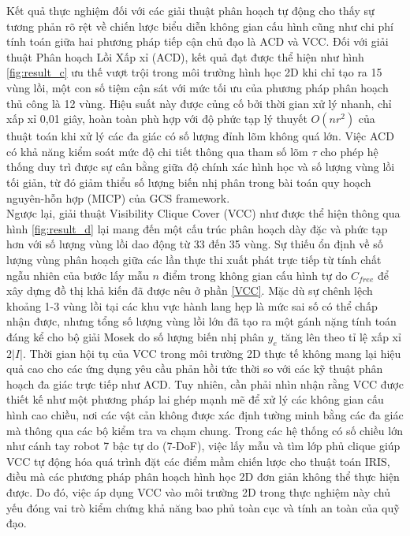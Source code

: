 Kết quả thực nghiệm đối với các giải thuật phân hoạch tự động cho thấy sự tương phản rõ rệt về chiến lược biểu diễn không gian cấu hình cũng như chi phí tính toán
giữa hai phương pháp tiếp cận chủ đạo là ACD và VCC. Đối với giải thuật Phân hoạch Lồi Xấp xỉ (ACD), 
kết quả đạt được thể hiện như hình \ref{fig:result_c} ưu thế vượt trội trong môi trường hình học 2D khi chỉ tạo ra 15 vùng lồi, một con số tiệm cận sát với mức tối ưu của phương pháp phân hoạch thủ công là 12 vùng. 
Hiệu suất này được củng cố bởi thời gian xử lý nhanh, chỉ xấp xỉ 0,01 giây, hoàn toàn phù hợp với độ phức tạp lý thuyết $O(nr^2)$ \cite{LienAmato2006} của thuật toán khi xử lý các đa giác có số lượng đỉnh lõm không quá lớn. 
Việc ACD có khả năng kiểm soát mức độ chi tiết thông qua tham số lõm $\tau$ cho phép hệ thống duy trì được sự cân bằng giữa độ chính xác hình học và số lượng vùng lồi tối giản, từ đó giảm thiểu số lượng biến nhị phân trong bài toán quy hoạch nguyên-hỗn hợp (MICP) 
của GCS framework. \\
Ngược lại, giải thuật Visibility Clique Cover (VCC) như được thể hiện thông qua hình \ref{fig:result_d} lại mang đến một cấu trúc phân hoạch dày đặc và phức tạp hơn với số lượng vùng lồi dao động từ 33 đến 35 vùng. Sự thiếu ổn định về số lượng vùng phân hoạch giữa các lần thực thi xuất phát trực tiếp 
từ tính chất ngẫu nhiên của bước lấy mẫu $n$ điểm trong không gian cấu hình tự do $C_{free}$ để xây dựng đồ thị khả kiến đã được nêu ở phần \ref{VCC}. Mặc dù sự chênh lệch khoảng 1-3 vùng lồi tại các khu vực hành lang hẹp là mức sai số có thể chấp nhận được, nhưng tổng số lượng vùng lồi lớn đã tạo 
ra một gánh nặng tính toán đáng kể cho bộ giải Mosek do số lượng biến nhị phân $y_e$ tăng lên theo tỉ lệ xấp xỉ $2|I|$. Thời gian hội tụ của VCC trong môi trường 2D thực tế không mang lại hiệu quả cao cho các ứng dụng yêu cầu phản hồi tức thời so với các kỹ thuật phân hoạch 
đa giác trực tiếp như ACD. Tuy nhiên, cần phải nhìn nhận rằng VCC được thiết kế như một phương pháp lai ghép mạnh mẽ để xử lý các không gian cấu hình cao chiều, nơi các vật cản không được xác định tường minh bằng các đa giác mà thông qua các bộ kiểm tra va chạm chung. 
Trong các hệ thống có số chiều lớn như cánh tay robot 7 bậc tự do (7-DoF), việc lấy mẫu và tìm lớp phủ clique giúp VCC tự động hóa quá trình đặt các điểm mầm chiến lược cho thuật toán IRIS, điều mà các phương pháp phân hoạch hình học 2D đơn giản không thể thực hiện được. 
Do đó, việc áp dụng VCC vào môi trường 2D trong thực nghiệm này chủ yếu đóng vai trò kiểm chứng khả năng bao phủ toàn cục và tính an toàn của quỹ đạo.

